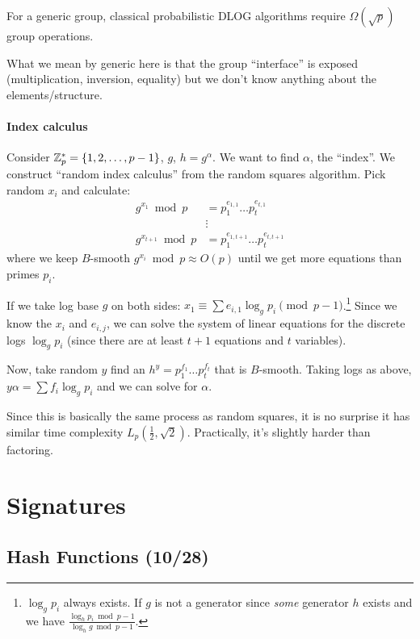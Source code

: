 \documentclass[notes]{agony}
\begin{document}
\begin{theorem}[Shoup]
  For a generic group, classical probabilistic DLOG algorithms
  require $\Omega(\sqrt{p})$ group operations.
\end{theorem}

What we mean by generic here is that the group ``interface''
is exposed (multiplication, inversion, equality) but we don't
know anything about the elements/structure.

\subsubsection*{Index calculus}

Consider $\mathbb{Z}_p^* = \{1,2,\dotsc,p-1\}$, $g$, $h = g^\alpha$.
We want to find $\alpha$, the ``index''.
We construct ``random index calculus'' from the random squares algorithm.
Pick random $x_i$ and calculate:
\begin{align*}
  g^{x_1} \bmod p     & = p_1^{e_{1,1}}\dots p_t^{e_{t,1}}     \\
                      & \vdots                                 \\
  g^{x_{t+1}} \bmod p & = p_1^{e_{1,t+1}}\dots p_t^{e_{t,t+1}}
\end{align*}
where we keep $B$-smooth $g^{x_i} \bmod p \approx O(p)$
until we get more equations than primes $p_i$.

If we take log base $g$ on both sides: $x_1 \equiv \sum e_{i,1}\log_g p_i \pmod{p-1}$.\footnote{
  $\log_g p_i$ always exists. If $g$ is not a generator
  since \emph{some} generator $h$ exists and we have
  $\frac{\log_h p_i \bmod p-1}{\log_h g \bmod p-1}$.}
Since we know the $x_i$ and $e_{i,j}$, we can solve the system of linear equations
for the discrete logs $\log_g p_i$ (since there are at least $t+1$ equations and $t$ variables).

Now, take random $y$ find an $h^y = p_1^{f_1}\dots p_t^{f_t}$ that is $B$-smooth.
Taking logs as above, $y\alpha = \sum f_i \log_g p_i$ and we can solve for $\alpha$.

Since this is basically the same process as random squares,
it is no surprise it has similar time complexity $L_p(\frac12,\sqrt2)$.
Practically, it's slightly harder than factoring.

\chapter{Signatures}

\section{Hash Functions (10/28)}
\end{document}
